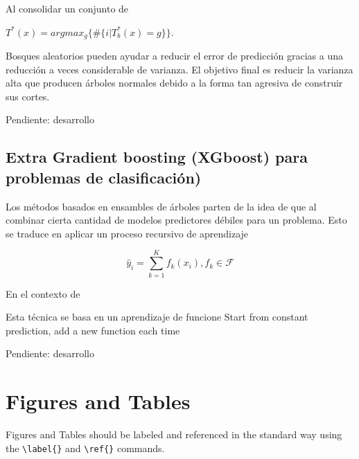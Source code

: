\documentclass[9pt,twocolumn,twoside]{ilcss}
\begin{document}
Al consolidar un conjunto de 

$T^*(x) = argmax_g \{ \# \{i|T_b^*(x)=g\}\}.$

Bosques aleatorios pueden ayudar a reducir el error de predicción gracias a una reducción a veces considerable de varianza. El objetivo final es reducir la varianza alta que producen árboles normales debido a la forma tan agresiva de construir sus cortes.

Pendiente: desarrollo

\subsection{Extra Gradient boosting (XGboost) para problemas de clasificación) }
Los métodos basados en ensambles de árboles parten de la idea de que al combinar cierta cantidad de modelos predictores débiles para un problema. Esto se traduce en aplicar un proceso recursivo de aprendizaje

\begin{equation}
\hat{y}_i = \sum_{k=1}^K f_k(x_i), f_k \in \mathcal{F}
\end{equation}



En el contexto de 

Esta técnica se basa en un aprendizaje de funcione
Start from constant prediction, add a new function each time


Pendiente: desarrollo

\section{Figures and Tables}

Figures and Tables should be labeled and referenced in the standard way using the \verb|\label{}| and \verb|\ref{}| commands.




\end{document}
